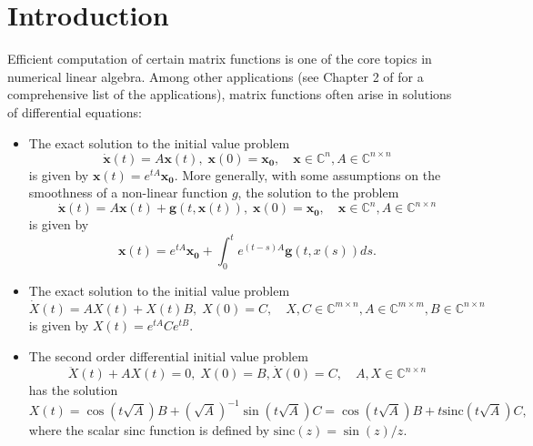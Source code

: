 \section{Introduction}

Efficient computation of certain matrix functions is one of the core topics in numerical linear
algebra. Among other applications (see Chapter 2 of \cite{higham2008functions} for a
comprehensive list of the applications), matrix functions often arise in solutions of
differential equations:
\begin{itemize}
    \item The exact solution to the initial value problem
        \begin{equation*}
            \dot{\mathbf{x}}(t) = A \mathbf{x}(t),\;
            \mathbf{x}(0) = \mathbf{x_0}, \quad
            \mathbf{x} \in \mathbb{C}^{n},
            A \in \mathbb{C}^{n \times n}
        \end{equation*}
        is given by $\mathbf{x}(t) = e^{tA} \mathbf{x_0}$.
        More generally, with some assumptions on the smoothness
        of a non-linear function $g$, the solution to the problem
        \begin{equation}
            \label{eq:exponentialintegratorproblem}
            \dot{\mathbf{x}}(t) = A \mathbf{x}(t) + \mathbf{g}(t, \mathbf{x}(t)), \; \mathbf{x}(0) = \mathbf{x_0},
            \quad \mathbf{x} \in \mathbb{C}^{n}, A \in \mathbb{C}^{n \times n}
        \end{equation}
        is given by
        \begin{equation}
            \label{eq:exponentialintegratorsolution}
            \mathbf{x}(t) = e^{tA} \mathbf{x_0} + \int_{0}^{t}{e^{(t-s)A} \mathbf{g}(t, x(s)) ds}.
        \end{equation}

    \item The exact solution to the initial value problem
    \begin{equation*}
        \dot{X}(t) = A X(t) + X(t) B, \; X(0) = C, \quad X,C \in \mathbb{C}^{m \times n}, A \in \mathbb{C}^{m \times m}, B \in \mathbb{C}^{n \times n}
    \end{equation*}
    is given by $X(t) = e^{tA} C e^{tB}$.

    \item The second order differential initial value problem
    \begin{equation*}
        \ddot{X}(t) + A X(t) = 0, \; X(0) = B, \dot{X}(0) = C, \quad A, X \in \mathbb{C}^{n \times n}
    \end{equation*}
    has the solution
    \begin{equation*}
        X(t) = \cos(t \sqrt{A}) B + (\sqrt{A})^{-1} \sin(t \sqrt{A}) C
        = \cos(t \sqrt{A}) B + t \mathrm{sinc}(t \sqrt{A}) C,
    \end{equation*}
    where the scalar sinc function is defined by $\mathrm{sinc}(z) = \sin(z) / z$.
\end{itemize}

